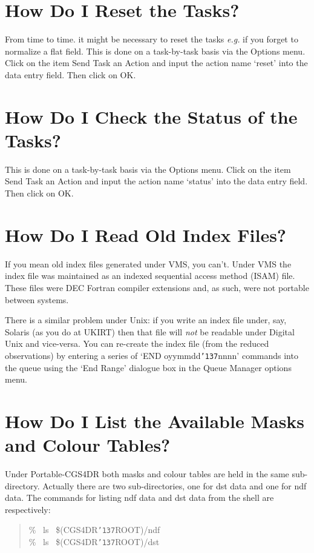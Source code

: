 \documentclass[a4paper]{book}
\renewcommand{\_}{{\tt\char'137}}
\begin{document}
\section{How Do I Reset the Tasks?}
\label{reset}
From time to time. it might be necessary to reset the tasks {\em e.g.} if you forget to
normalize a {\sc flat} field. This is done on a task-by-task basis via the {\sf Options}
menu. Click on the item {\sf Send Task an Action} and input the action name `reset'
into the data entry field. Then click on {\sf OK}.

\section{How Do I Check the Status of the Tasks?}
This is done on a task-by-task basis via the {\sf Options}
menu. Click on the item {\sf Send Task an Action} and input the action name `status'
into the data entry field. Then click on {\sf OK}.

\section{How Do I Read Old Index Files?}
If you mean old index files generated under VMS, you can't. Under VMS the index file was maintained as an indexed sequential
access method (ISAM) file. These files were DEC Fortran compiler extensions and, as such,
were not portable between systems.

There is a similar problem under Unix: if you write an index file under, say, Solaris (as you do at UKIRT) then that file will 
{\em not} be readable under Digital Unix and vice-versa. You can re-create the index file (from the reduced observations)
by entering a series of `END oyymmdd\_nnnn' commands into the queue using the `End Range' dialogue box in the Queue
Manager options menu.

\section{How Do I List the Available Masks and Colour Tables?}
Under Portable-CGS4DR both masks and colour tables are held in the same sub-directory.
Actually there are two sub-directories, one for {\sc dst} data and one for {\sc ndf} data.
The commands for listing {\sc ndf} data and {\sc dst} data from the shell are respectively:

\begin{quote}
 \% \ ls \ \$(CGS4DR\_ROOT)/ndf \\
 \% \ ls \ \$(CGS4DR\_ROOT)/dst
\end{quote}
\end{document}
